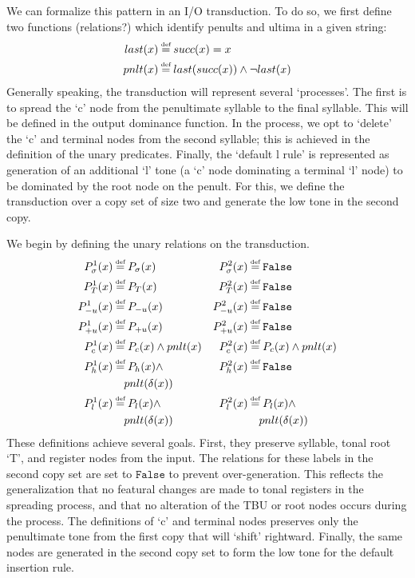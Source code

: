 \documentclass{article}
\newcommand\myeq{\mathrel{\stackrel{\makebox[0pt]{\mbox{\normalfont\tiny def}}}{=}}}
\begin{document}
We can formalize this pattern in an I/O transduction. To do so, we first define two functions (relations?) which identify penults and ultima in a given string:
\begin{equation}
\begin{aligned}
last(x)&\myeq succ(x) = x \\
pnlt(x)&\myeq last(succ(x))\land \neg last(x) \\
\end{aligned}
\end{equation}
Generally speaking, the transduction will represent several `processes'. The first is to spread the `c' node from the penultimate syllable to the final syllable. This will be defined in the output dominance function. In the process, we opt to `delete' the `c' and terminal nodes from the second syllable; this is achieved in the definition of the unary predicates. Finally, the `default l rule' is represented as generation of an additional `l' tone (a `c' node dominating a terminal `l' node) to be dominated by the root node on the penult. For this, we define the transduction over a copy set of size two and generate the low tone in the second copy. \par
We begin by defining the unary relations on the transduction.
\begin{equation} \label{unary}
\begin{aligned}
P^{1}_{\sigma}(x)&\myeq P_{\sigma}(x) & P^{2}_{\sigma}(x)&\myeq \mathtt{False} \\
P^{1}_{T}(x)&\myeq P_{T}(x) & P^{2}_{T}(x)&\myeq \mathtt{False} \\
P^{1}_{-u}(x)&\myeq P_{-u}(x) & P^{2}_{-u}(x)&\myeq \mathtt{False} \\
P^{1}_{+u}(x)&\myeq P_{+u}(x) & P^{2}_{+u}(x)&\myeq \mathtt{False} \\
P^{1}_{c}(x)&\myeq P_{c}(x)\land pnlt(x) & P^{2}_{c}(x)&\myeq P_{c}(x)\land pnlt(x) \\
P^{1}_{h}(x)&\myeq P_{h}(x)\land & P^{2}_{h}(x)&\myeq \mathtt{False} \\
&\quad pnlt(\delta(x)) \\
P^{1}_{l}(x)&\myeq P_{l}(x)\land  & P^{2}_{l}(x)&\myeq P_{l}(x)\land \\
&\quad pnlt(\delta(x)) & &\quad pnlt(\delta(x)) \\
\end{aligned}
\end{equation}
These definitions achieve several goals. First, they preserve syllable, tonal root `T', and register nodes from the input. The relations for these labels in the second copy set are set to $\mathtt{False}$ to prevent over-generation. This reflects the generalization that no featural changes are made to tonal registers in the spreading process, and that no alteration of the TBU or root nodes occurs during the process. The definitions of `c' and terminal nodes preserves only the penultimate tone from the first copy that will `shift' rightward. Finally, the same nodes are generated in the second copy set to form the low tone for the default insertion rule. \par 
\end{document}
